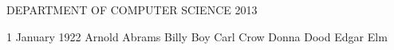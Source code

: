 \documentclass[dissertation,CC-BY-ND]{uathesis}
\begin{document}
\maketitlepage%
{DEPARTMENT OF COMPUTER SCIENCE}	%
{2013}

\approval%
{1 January 1922}		%
{Arnold Abrams}		%
{Billy Boy}		%
{Carl Crow}		%
{Donna Dood}		    %
{Edgar Elm} %
{} %



\tableofcontents

\listoffigures

\listoftables




\appendix


\renewcommand{\baselinestretch}{1}		%
\small\normalsize										%

\printbibliography
\end{document}
